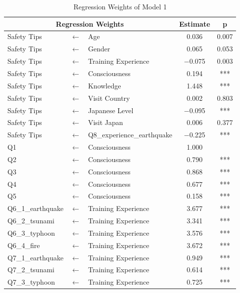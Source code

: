 \begin{table}[h]
  \caption{Regression Weights of Model 1}
  \label{table9}
  \centering
  \begin{tabular}{|l|c|l|c|c|}
 \hline
 \multicolumn{3}{|c|}{Regression Weights} & Estimate & p \\
 \hline
  Safety Tips & $\longleftarrow$ & Age & 0.036 & 0.007 \\ 
  Safety Tips & $\longleftarrow$ & Gender &0.065 & 0.053 \\
  Safety Tips & $\longleftarrow$ & Training Experience & $-$0.075 & 0.003 \\
  Safety Tips & $\longleftarrow$ & Consciousness & 0.194 & *** \\
  Safety Tips & $\longleftarrow$ & Knowledge & 1.448 & *** \\
  Safety Tips & $\longleftarrow$ & Visit Country & 0.002 & 0.803 \\
  Safety Tips & $\longleftarrow$ & Japanese Level & $-$0.095 & *** \\
  Safety Tips & $\longleftarrow$ & Visit Japan & 0.006 & 0.377 \\
  Safety Tips & $\longleftarrow$ & Q8\_experience\_earthquake & $-$0.225 & *** \\
  Q1              & $\longleftarrow$ & Consciousness & 1.000 &  \\
  Q2              & $\longleftarrow$ & Consciousness & 0.790 & *** \\
  Q3              & $\longleftarrow$ & Consciousness & 0.868 & *** \\
  Q4              & $\longleftarrow$ & Consciousness & 0.677 & *** \\
  Q5              & $\longleftarrow$ & Consciousness & 0.158 & *** \\
  Q6\_1\_earthquake & $\longleftarrow$ & Training Experience & 3.677 & *** \\
  Q6\_2\_tsunami & $\longleftarrow$ & Training Experience & 3.341 & *** \\
  Q6\_3\_typhoon & $\longleftarrow$ & Training Experience & 3.576 & *** \\
  Q6\_4\_fire & $\longleftarrow$ & Training Experience & 3.672 & *** \\
  Q7\_1\_earthquake & $\longleftarrow$ & Training Experience & 0.949 & *** \\
  Q7\_2\_tsunami & $\longleftarrow$ & Training Experience & 0.614 & *** \\
  Q7\_3\_typhoon & $\longleftarrow$ & Training Experience & 0.725 & *** \\

\end{tabular}
\end{table}
